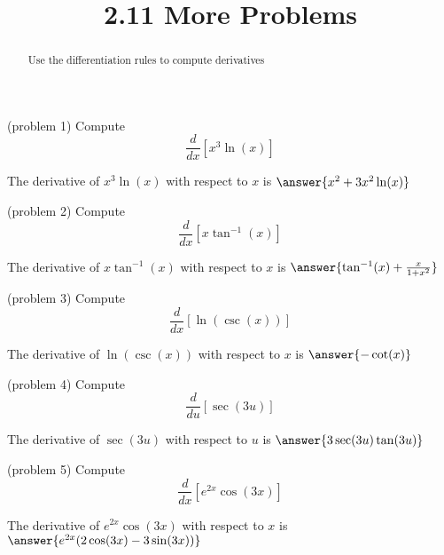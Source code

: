 \documentclass[handout]{ximera}
\title{2.11 More Problems}
\begin{document}
\begin{abstract}
Use the differentiation rules to compute derivatives
\end{abstract}

\maketitle








\begin{problem}(problem 1)
  Compute
  \[
  \frac{d}{dx}\left[x^3\ln(x)\right]
  \]
  
    
    
		The derivative of $x^3\ln (x)$ with respect to $x$ is
		 $\answer{x^2 + 3x^2\ln(x)}$
		
\end{problem}





\begin{problem}(problem 2)
  Compute
  \[
  \frac{d}{dx} \left[x \tan^{-1} (x)\right]
  \]
  
    
    
		The derivative of $x \tan^{-1} (x)$ with respect to $x$ is
		 $\answer{\tan^{-1}(x) + \frac{x}{1+x^2}}$
		
\end{problem}



\begin{problem}(problem 3)
  Compute
  \[
  \frac{d}{dx}\left[ \ln(\csc (x))\right]
  \]
  
    
    
		The derivative of $\ln(\csc (x))$ with respect to $x$ is
		 $\answer{-\cot(x)}$
		
\end{problem}



\begin{problem}(problem 4)
  Compute
  \[
  \frac{d}{du} \left[\sec(3u)\right]
  \]
  
    
    
		The derivative of $\sec(3u)$ with respect to $u$ is
		 $\answer{3\sec(3u)\tan(3u)}$
		
\end{problem}


\begin{problem}(problem 5)
  Compute
  \[
  \frac{d}{dx} \left[e^{2x} \cos(3x)\right]
  \]
  
   
    
		The derivative of $e^{2x} \cos(3x)$ with respect to $x$ is
		 $\answer{e^{2x}(2\cos(3x)-3\sin(3x))}$
		
\end{problem}
\end{document}
